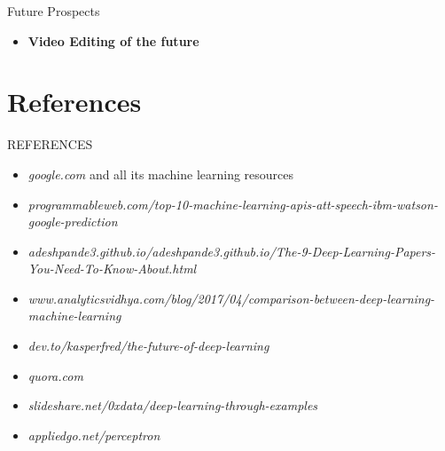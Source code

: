 \documentclass[10pt]{beamer}
\begin{document}
	\begin{frame}[c]{Future Prospects}
		\begin{itemize}
			\item \large{\textbf{Video Editing of the future}}
		\end{itemize}
	\end{frame}
	\section{References}
	\begin{frame}[c]{REFERENCES}
		\begin{itemize}
			\item \textit{google.com} and all its machine learning resources
			\item \textit{programmableweb.com/top-10-machine-learning-apis-att-speech-ibm-watson-google-prediction}
			\item \textit{adeshpande3.github.io/adeshpande3.github.io/The-9-Deep-Learning-Papers-You-Need-To-Know-About.html}
			\item \textit{www.analyticsvidhya.com/blog/2017/04/comparison-between-deep-learning-machine-learning}
			\item \textit{dev.to/kasperfred/the-future-of-deep-learning}
			\item \textit{quora.com}
			\item \textit{slideshare.net/0xdata/deep-learning-through-examples}
			\item \textit{appliedgo.net/perceptron}
		\end{itemize}
	\end{frame}
\end{document}
